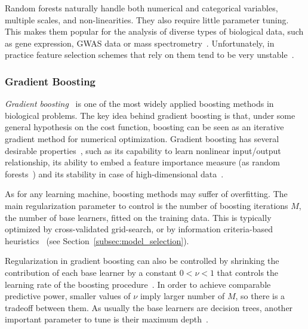 	    Random forests naturally handle both numerical and categorical variables, multiple scales, and non-linearities. They also require little parameter tuning. This makes them popular for the analysis of diverse types of biological data, such as gene expression, GWAS data or mass spectrometry~\cite{qi2012random}. Unfortunately, in practice feature selection schemes that rely on them tend to be very unstable~\cite{kursa2014robustness}.

	    \subsubsection{Gradient Boosting}
	    \textit{Gradient boosting}~\citep{friedman2001greedy}  is one of the most widely applied boosting methods in biological problems.
	    The key idea behind gradient boosting is that, under some general hypothesis on the cost function, boosting can be seen as an iterative gradient method for numerical optimization.
	    Gradient boosting has several desirable properties~\citep{mayr2014evolution}, such as its capability to learn nonlinear input/output relationship, its ability to embed a feature importance measure (as random forests~\citep{hastie2009elements}) and its stability in case of high-dimensional data~\citep{buehlmann2006boosting}.


	    As for any learning machine, boosting methods may suffer of overfitting. The main regularization parameter to control is the number of boosting iterations $M$, \ie the number of base learners, fitted on the training data. This is typically optimized by cross-validated grid-search, or by information criteria-based heuristics~\citep{tutz2006generalized, tutz2007boosting} (see Section~\ref{subsec:model_selection}).

	    Regularization in gradient boosting can also be controlled by shrinking the contribution of each base learner by a constant $0<\nu<1$ that controls the learning rate of the boosting procedure~\citep{hastie2009elements}. In order to achieve comparable predictive power, smaller values of $\nu$ imply larger number of $M$, so there is a tradeoff between them.
	    As usually the base learners are decision trees, another important parameter to tune is their maximum depth~\citep{hastie2009elements}.

